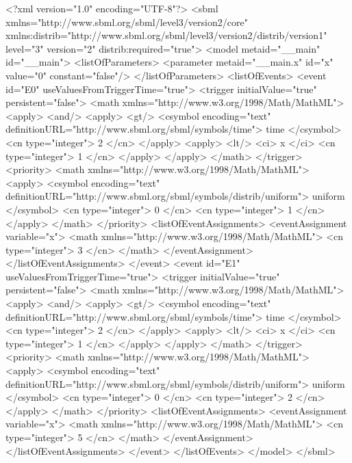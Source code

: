 \documentclass[draftspec]{sbmlpkgspec}
\begin{document}
\begin{blockChanged}
\begin{example}
<?xml version="1.0" encoding="UTF-8"?>
<sbml xmlns="http://www.sbml.org/sbml/level3/version2/core"
      xmlns:distrib="http://www.sbml.org/sbml/level3/version2/distrib/version1"
      level="3" version="2" distrib:required="true">
  <model metaid="__main" id="__main">
    <listOfParameters>
      <parameter metaid="__main.x" id="x" value="0" constant="false"/>
    </listOfParameters>
    <listOfEvents>
      <event id="E0" useValuesFromTriggerTime="true">
        <trigger initialValue="true" persistent="false">
          <math xmlns="http://www.w3.org/1998/Math/MathML">
            <apply>
              <and/>
              <apply>
                <gt/>
                <csymbol encoding="text" definitionURL="http://www.sbml.org/sbml/symbols/time">
                         time </csymbol>
                <cn type="integer"> 2 </cn>
              </apply>
              <apply>
                <lt/>
                <ci> x </ci>
                <cn type="integer"> 1 </cn>
              </apply>
            </apply>
          </math>
        </trigger>
        <priority>
          <math xmlns="http://www.w3.org/1998/Math/MathML">
            <apply>
              <csymbol encoding="text" definitionURL="http://www.sbml.org/sbml/symbols/distrib/uniform">
                       uniform </csymbol>
              <cn type="integer"> 0 </cn>
              <cn type="integer"> 1 </cn>
            </apply>
          </math>
        </priority>
        <listOfEventAssignments>
          <eventAssignment variable="x">
            <math xmlns="http://www.w3.org/1998/Math/MathML">
              <cn type="integer"> 3 </cn>
            </math>
          </eventAssignment>
        </listOfEventAssignments>
      </event>
      <event id="E1" useValuesFromTriggerTime="true">
        <trigger initialValue="true" persistent="false">
          <math xmlns="http://www.w3.org/1998/Math/MathML">
            <apply>
              <and/>
              <apply>
                <gt/>
                <csymbol encoding="text" definitionURL="http://www.sbml.org/sbml/symbols/time">
                         time </csymbol>
                <cn type="integer"> 2 </cn>
              </apply>
              <apply>
                <lt/>
                <ci> x </ci>
                <cn type="integer"> 1 </cn>
              </apply>
            </apply>
          </math>
        </trigger>
        <priority>
          <math xmlns="http://www.w3.org/1998/Math/MathML">
            <apply>
              <csymbol encoding="text" definitionURL="http://www.sbml.org/sbml/symbols/distrib/uniform">
                       uniform </csymbol>
              <cn type="integer"> 0 </cn>
              <cn type="integer"> 2 </cn>
            </apply>
          </math>
        </priority>
        <listOfEventAssignments>
          <eventAssignment variable="x">
            <math xmlns="http://www.w3.org/1998/Math/MathML">
              <cn type="integer"> 5 </cn>
            </math>
          </eventAssignment>
        </listOfEventAssignments>
      </event>
    </listOfEvents>
  </model>
</sbml>
\end{example}

\end{blockChanged}
\end{document}
